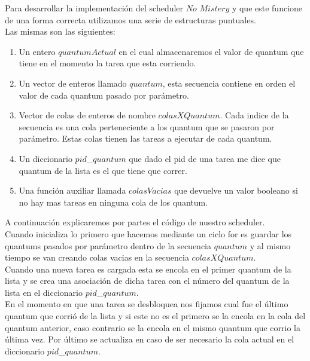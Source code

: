 Para desarrollar la implementación del scheduler $No$ $Mistery$ y que este funcione de una forma correcta
utilizamos una serie de estructuras puntuales. \\
Las mismas son las siguientes:\\
\begin{enumerate}
\item Un entero $quantumActual$ en el cual almacenaremos el valor de quantum que tiene en el momento la tarea que esta corriendo.
\item Un vector de enteros llamado $quantum$, esta secuencia contiene en orden el valor de cada quantum pasado por par\'{a}metro.
\item Vector de colas de enteros de nombre $colasXQuantum$. Cada indice de la secuencia es una cola perteneciente a los quantum 
que se pasaron por par\'{a}metro. Estas colas tienen las tareas a ejecutar de cada quantum.
\item Un diccionario $pid$\_$quantum$ que dado el pid de una tarea me dice que quantum de la lista es el que tiene que correr.
\item Una funci\'{o}n auxiliar llamada $colasVacias$ que devuelve un valor booleano si no hay mas tareas en ninguna cola de los 
quantum.
\end{enumerate}

A continuación explicaremos por partes el c\'{o}digo de nuestro scheduler.\\

Cuando inicializa lo primero que hacemos mediante un ciclo for es guardar los quantums pasados por par\'{a}metro dentro de la 
secuencia $quantum$ y al mismo tiempo se van creando colas vacias en la secuencia $colasXQuantum$.\\

Cuando una nueva tarea es cargada esta se encola en el primer quantum de la lista y se crea una asociaci\'{o}n de dicha tarea 
con el número del quantum de la lista en el diccionario $pid$\_$quantum$.\\

En el momento en que una tarea se desbloquea nos fijamos cual fue el \'{u}ltimo quantum que corrió de la lista y si este no es 
el primero se la encola en la cola del quantum anterior, caso contrario se la encola en el mismo quantum que corrio la \'{u}ltima vez.
Por \'{u}ltimo se actualiza en caso de ser necesario la cola actual en el diccionario $pid$\_$quantum$.\\

